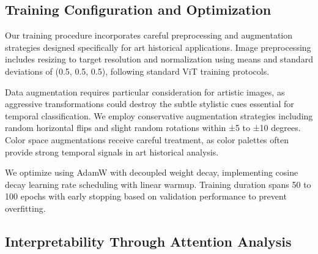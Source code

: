 \documentclass[10pt,twocolumn,letterpaper]{article}
\begin{document}

\subsection{Training Configuration and Optimization}

Our training procedure incorporates careful preprocessing and augmentation strategies designed specifically for art historical applications. Image preprocessing includes resizing to target resolution and normalization using means and standard deviations of (0.5, 0.5, 0.5), following standard ViT training protocols.

Data augmentation requires particular consideration for artistic images, as aggressive transformations could destroy the subtle stylistic cues essential for temporal classification. We employ conservative augmentation strategies including random horizontal flips and slight random rotations within ±5 to ±10 degrees. Color space augmentations receive careful treatment, as color palettes often provide strong temporal signals in art historical analysis.

We optimize using AdamW with decoupled weight decay, implementing cosine decay learning rate scheduling with linear warmup. Training duration spans 50 to 100 epochs with early stopping based on validation performance to prevent overfitting.

\subsection{Interpretability Through Attention Analysis}
\end{document}
